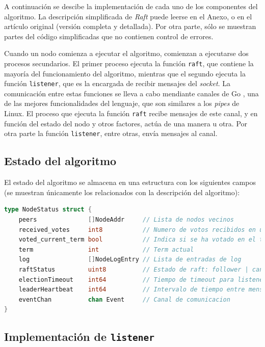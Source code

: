 A continuación se descibe la implementación de cada uno de los componentes del algoritmo. La descripción simplificada de \textit{Raft} puede leerse en el Anexo, o en el artículo original \cite{raft1} (versión completa y detallada). Por otra parte, sólo se muestran partes del código simplificadas que no contienen control de errores.

Cuando un nodo comienza a ejecutar el algoritmo, comienzan a ejecutarse dos procesos secundarios. El primer proceso ejecuta la función \texttt{raft}, que contiene la mayoría del funcionamiento del algoritmo, mientras que el segundo ejecuta la función \texttt{listener}, que es la encargada de recibir mensajes del \textit{socket}. La comunicación entre estas funciones se lleva a cabo mendiante canales de Go \cite{gochannels}, una de las mejores funcionalidades del lenguaje, que son similares a los \textit{pipes} de Linux. El proceso que ejecuta la función \texttt{raft} recibe mensajes de este canal, y en función del estado del nodo y otros factores, actúa de una manera u otra. Por otra parte la función \texttt{listener}, entre otras, envía mensajes al canal.

\subsection{Estado del algoritmo}

El estado del algoritmo se almacena en una estructura con los siguientes campos (se muestran únicamente los relacionados con la descripción del algoritmo):

\begin{lstlisting}[language=go]
type NodeStatus struct {
	peers              []NodeAddr     // Lista de nodos vecinos
	received_votes     int8           // Numero de votos recibidos en una eleccion
	voted_current_term bool           // Indica si se ha votado en el term acutal
	term               int            // Term actual
	log                []NodeLogEntry // Lista de entradas de log
	raftStatus         uint8          // Estado de raft: follower | candidate | leader
	electionTimeout    int64          // Tiempo de timeout para listener()
	leaderHeartbeat    int64          // Intervalo de tiempo entre mensajes para leaderHeartbeats()
	eventChan          chan Event     // Canal de comunicacion
}
\end{lstlisting}

\subsection{Implementación de \texttt{listener}}

